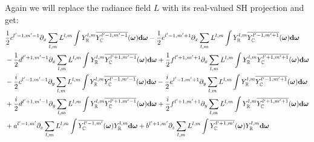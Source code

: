 Again we will replace the radiance field $L$ with its real-valued SH projection and get:
\begin{align*}
&
\frac{1}{2}c^{{l'-1,m'-1}}\partial_x\sum_{l,m}L^{l,m}\int{Y_{\mathbb{R}}^{l,m}\overline{Y_{\mathbb{C}}^{l'-1, m'-1}}(\boldsymbol{\mathbf{\omega}} )\mathbf{d}\boldsymbol{\mathbf{\omega}}}
-\frac{1}{2}e^{{l'-1,m'+1}}\partial_x\sum_{l,m}L^{l,m}\int{Y_{\mathbb{R}}^{l,m}\overline{Y_{\mathbb{C}}^{l'-1, m'+1}}(\boldsymbol{\mathbf{\omega}} )\mathbf{d}\boldsymbol{\mathbf{\omega}}}
\\&
-\frac{1}{2}d^{{l'+1,m'-1}}\partial_x\sum_{l,m}L^{l,m}\int{Y_{\mathbb{R}}^{l,m}\overline{Y_{\mathbb{C}}^{l'+1, m'-1}}(\boldsymbol{\mathbf{\omega}} )\mathbf{d}\boldsymbol{\mathbf{\omega}}}
+\frac{1}{2}f^{{l'+1,m'+1}}\partial_x\sum_{l,m}L^{l,m}\int{Y_{\mathbb{R}}^{l,m}\overline{Y_{\mathbb{C}}^{l'+1, m'+1}}(\boldsymbol{\mathbf{\omega}} )\mathbf{d}\boldsymbol{\mathbf{\omega}}}
\\&
-\frac{i}{2}c^{{l'-1,m'-1}}\partial_y\sum_{l,m}L^{l,m}\int{Y_{\mathbb{R}}^{l,m}\overline{Y_{\mathbb{C}}^{l'-1, m'-1}}(\boldsymbol{\mathbf{\omega}} )\mathbf{d}\boldsymbol{\mathbf{\omega}}}
-\frac{i}{2}e^{{l'-1,m'+1}}\partial_y\sum_{l,m}L^{l,m}\int{Y_{\mathbb{R}}^{l,m}\overline{Y_{\mathbb{C}}^{l'-1, m'+1}}(\boldsymbol{\mathbf{\omega}} )\mathbf{d}\boldsymbol{\mathbf{\omega}}}
\\&
+\frac{i}{2}d^{{l'+1,m'-1}}\partial_y\sum_{l,m}L^{l,m}\int{Y_{\mathbb{R}}^{l,m}\overline{Y_{\mathbb{C}}^{l'+1, m'-1}}(\boldsymbol{\mathbf{\omega}} )\mathbf{d}\boldsymbol{\mathbf{\omega}}}
+\frac{i}{2}f^{{l'+1,m'+1}}\partial_y\sum_{l,m}L^{l,m}\int{Y_{\mathbb{R}}^{l,m}\overline{Y_{\mathbb{C}}^{l'+1, m'+1}}(\boldsymbol{\mathbf{\omega}} )\mathbf{d}\boldsymbol{\mathbf{\omega}}}
\\&
+a^{{l'-1,m'}}\partial_z\sum_{l,m}L^{l,m}\int{\overline{Y_{\mathbb{C}}^{l'-1, m'}}(\boldsymbol{\mathbf{\omega}} )Y_{\mathbb{R}}^{l,m}\mathbf{d}\boldsymbol{\mathbf{\omega}}}
+b^{{l'+1,m'}}\partial_z\sum_{l,m}L^{l,m}\int{\overline{Y_{\mathbb{C}}^{l'+1, m'}}(\boldsymbol{\mathbf{\omega}} )Y_{\mathbb{R}}^{l,m}\mathbf{d}\boldsymbol{\mathbf{\omega}}}
\end{align*}

